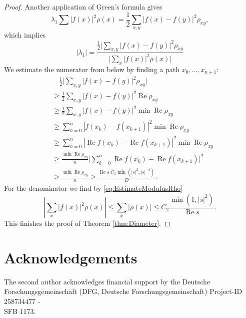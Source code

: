 \documentclass[a4paper,11pt]{amsart}
\theoremstyle{definition}
\renewcommand{\Re}{\operatorname{Re}}%
\begin{document}
\begin{proof}
Another application of Green's formula gives
\begin{equation*}
\lambda_1 \sum |f(x)|^2 \rho(x) = \frac{1}{2} \sum_{x,y} |f(x)-f(y)|^2 \rho_{xy},
\end{equation*}
which implies
\begin{equation*}
|\lambda_1| = \frac{\frac{1}{2} \big| \sum_{x,y} |f(x)-f(y)|^2 \rho_{xy}}{\big| \sum_x |f(x)|^2 \rho(x) \big|}
\end{equation*}
We estimate the numerator from below by finding a path $x_0,\ldots,x_{n+1}$:
\begin{align*}
&\quad \frac{1}{2} \big| \sum_{x,y} |f(x)-f(y)|^2 \rho_{xy} \big| \\
&\geq \frac{1}{2} \sum_{x,y} |f(x)-f(y)|^2 \Re \rho_{xy} \\
&\geq \frac{1}{2} \sum_{x,y} |f(x)-f(y)|^2 \min \Re \rho_{xy} \\
&\geq \sum_{k=0}^n |f(x_k) - f(x_{k+1})|^2 \min \Re \rho_{xy} \\
&\geq \sum_{k=0}^n | \Re f(x_k) - \Re f(x_{k+1}) |^2 \min \Re \rho_{xy} \\
&\geq \frac{\min \Re \rho_{xy}}{n} \big| \sum_{k=0}^n \Re f(x_k) - \Re f(x_{k+1}) \big|^2 \\
&\geq \frac{\min \Re \rho_{xy}}{n} \geq \frac{\Re s \; C_1 \min(|s|^2,|s|^{-4})}{D}.
\end{align*}
For the denominator we find by \eqref{eq:EstimateModulusRho}
\begin{equation*}
\left| \sum_x |f(x)|^2 \rho(x) \right| \leq \sum_x |\rho(x)| \leq C_2 \frac{\min(1,|s|^2)}{\Re s}.
\end{equation*}
This finishes the proof of Theorem \ref{thm:Diameter}.
\end{proof}

\section*{Acknowledgements}
The second author acknowledges financial support by the Deutsche Forschungsgemeinschaft (DFG, Deutsche Forschungsgemeinschaft) Project-ID 258734477 -\\ SFB 1173.
\end{document}
